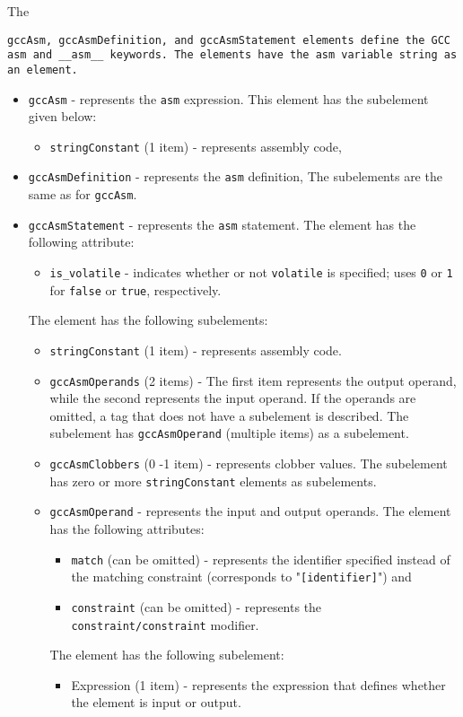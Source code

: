 The {\tt gccAsm, {\tt gccAsmDefinition}, and {\tt gccAsmStatement} elements define the GCC {\tt asm} and {\tt \_\_asm\_\_} keywords. The elements have the asm variable string as an element.

\begin{itemize}
\item {\tt gccAsm} - represents the {\tt asm} expression. This element has the subelement given below:
  \begin{itemize}
  \item {\tt stringConstant} (1 item) - represents assembly code,
  \end{itemize}
\item {\tt gccAsmDefinition} - represents the {\tt asm} definition, 
  The subelements are the same as for {\tt gccAsm}.
\item {\tt gccAsmStatement} - represents the {\tt asm} statement.
  The element has the following attribute:
  \begin{itemize}
  \item {\tt is\_volatile} - indicates whether or not {\tt volatile} is specified; uses {\tt 0} or {\tt 1} for {\tt false} or {\tt true}, respectively.
  \end{itemize}
  The element has the following subelements:
  \begin{itemize}
  \item {\tt stringConstant} (1 item) - represents assembly code.
  \item {\tt gccAsmOperands} (2 items) - The first item represents the output operand, while the second represents the input operand. If the operands are omitted, a tag that does not have a subelement is described. The subelement has {\tt gccAsmOperand} (multiple items) as a subelement.
  \item {\tt gccAsmClobbers} (0 -1 item) - represents clobber values. 
  The subelement has zero or more {\tt stringConstant} elements as subelements.
  \item {\tt gccAsmOperand} - represents the input and output operands. 
    The element has the following attributes: 
    \begin{itemize}
    \item {\tt match} (can be omitted)  - represents the identifier specified instead of the matching constraint (corresponds to "{\tt [identifier]}") and
    \item {\tt constraint} (can be omitted)  - represents the {\tt constraint/constraint} modifier.
    \end{itemize}
    The element has the following subelement:
    \begin{itemize}
    \item Expression (1 item) - represents the expression that defines whether the element is input or output.
    \end{itemize}
  \end{itemize}
\end{itemize}

}
